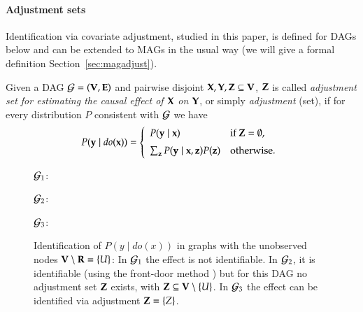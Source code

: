 \paragraph{Adjustment sets}
Identification via covariate adjustment, studied in this paper, is defined for DAGs below
and can be extended to MAGs in the usual way \citep{Maathuis2013}
(we will give a formal definition Section~\ref{sec:magadjust}).

\begin{definition}
\label{def:adjustment:set}
Given a DAG ${\cal G}=({\bf V},{\bf E})$ and 
pairwise disjoint
${\bf X},{\bf Y},{\bf Z} \subseteq {\bf V}$, 
${\bf Z}$ is called \emph{adjustment set for estimating the causal effect of ${\bf X}$ on ${\bf Y}$}, 
or simply \emph{adjustment} (set), if for every distribution %
$P$ consistent with ${\cal G}$ we have 
\begin{equation}\label{eq:adjustment:def}
P({\bf y}\mid \textit{do}({\bf x})) = \left\{
  \begin{array}{ll}
   P({\bf y}\mid {\bf x})                       & \text{if ${\bf Z} = \emptyset$,}\\[2mm]
   \sum_{{\bf z}} P({\bf y}\mid {\bf x},{\bf z}) P({\bf z}) & \text{otherwise.}
  \end{array}
\right.
\end{equation}
%
\end{definition}

\begin{figure}
\centering
${\cal G}_1$:
\hspace*{10mm}${\cal G}_2$:
\hspace*{10mm}${\cal G}_3$:
\caption{Identification of $P(y \mid  \textit{do}(x))$ in graphs with the unobserved nodes
${\bf V}\setminus{\bf R}=\{U\}$: In ${\cal G}_1$ the effect is not identifiable. In ${\cal G}_2$, it is identifiable 
(using the front-door method \cite{Pearl2009}) but 
for this DAG no adjustment set ${\bf Z}$ exists, with ${\bf Z}\subseteq{\bf V}\setminus\{U\}$. 
In ${\cal G}_3$ the effect can be identified via adjustment ${\bf Z}=\{Z\}$.
}
\label{fig:notident:ident:viaadj}
\end{figure}



